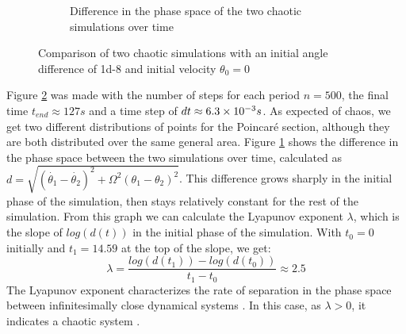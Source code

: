 \documentclass[a4paper,12pt,twoside]{article}
\begin{document}
\begin{figure}[h]
\begin{subfigure}[t]{0.45\textwidth}
		\caption{Difference in the phase space of the two chaotic simulations over time}
		\label{fig:e-lyap-chaos}
	\end{subfigure}
	\caption{Comparison of two chaotic simulations with an initial angle difference of \num{1d-8} and initial velocity $\theta_0 = 0$}
	\label{fig:e-chaos}
\end{figure}

Figure \ref{fig:e-chaos} was made with the number of steps for each period $n=500$, the final time $t_{end} \approx \num{127} s$ and a time step of $dt \approx \num{6.3d-3} s$. As expected of chaos, we get two different distributions of points for the Poincaré section, although they are both distributed over the same general area. Figure \ref{fig:e-lyap-chaos} shows the difference in the phase space between the two simulations over time, calculated as $d=\sqrt{(\dot{\theta_1}-\dot{\theta_2})^2 + \Omega^2 (\theta_1-\theta_2)^2}$. This difference grows sharply in the initial phase of the simulation, then stays relatively constant for the rest of the simulation. From this graph we can calculate the Lyapunov exponent $\lambda$, which is the slope of $log(d(t))$ in the initial phase of the simulation. With $t_0 = 0$ initially and $t_1=14.59$ at the top of the slope, we get:
\begin{equation*}
\lambda = \frac{log(d(t_1))-log(d(t_0))}{t_1-t_0} \approx 2.5
\end{equation*}
The Lyapunov exponent characterizes the rate of separation in the phase space between infinitesimally close dynamical systems \cite{Lyap}. In this case, as $\lambda > 0$, it indicates a chaotic system \cite{Lyap2}.
\end{document}
